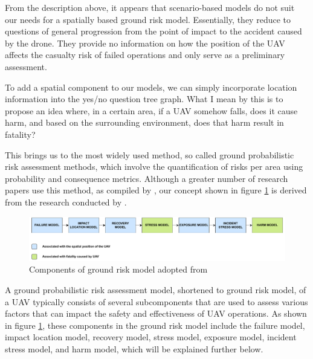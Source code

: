 \documentclass[12pt]{report}
\begin{document}
        From the description above, it appears that scenario-based models do not suit our needs for a spatially based
        ground risk model. Essentially, they reduce to questions of general progression from the point of impact to the
        accident caused by the drone. They provide no information on how the position of the UAV affects the casualty
        risk of failed operations and only serve as a preliminary assessment.
            
        To add a spatial component to our models, we can simply incorporate location information into the yes/no
        question tree graph. What I mean by this is to propose an idea where, in a certain area, if a UAV somehow falls,
        does it cause harm, and based on the surrounding environment, does that harm result in fatality?
            
        This brings us to the most widely used method, so called ground probabilistic risk assessment methods, which
        involve the quantification of risks per area using probability and consequence metrics. Although a greater
        number of research papers use this method, as compiled by \cite{washington_review_2017}, our concept shown in
        figure \ref{fig:prime_example} is derived from the research conducted by \cite{primatesta_ground_2020}. 

        \begin{figure}[H]
            \centering
            \includegraphics[width=\textwidth]{General Image/OSM Drone-GROUND.pdf}
            \caption{Components of ground risk model adopted from \protect\cite{primatesta_ground_2020}}
            \label{fig:prime_example}
        \end{figure}

        A ground probabilistic risk assessment model, shortened to ground risk model, of a UAV typically consists of
        several subcomponents that are used to assess various factors that can impact the safety and effectiveness of
        UAV operations. As shown in figure \ref{fig:prime_example}, these components in the ground risk model include the
        failure model, impact location model, recovery model, stress model, exposure model, incident stress model, and
        harm model, which will be explained further below.
\end{document}
